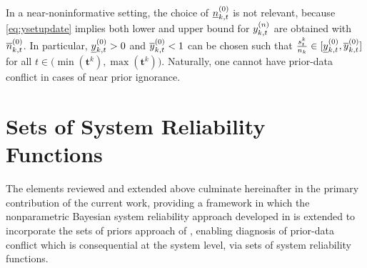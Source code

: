 \documentclass[12pt, a4paper]{elsarticle}
\newcommand{\bs}[1]{\boldsymbol{#1}}
\renewcommand{\vec}[1]{{\bs#1}}
\newcommand{\td}[1]{%
  \iftoggle{td}{%
    \todo[inline]{#1}%
  }{}%
}
\begin{document}
%
In a near-noninformative setting, the choice of $\underline{n}^{(0)}_{k,t}$ is not relevant,
because \eqref{eq:ysetupdate} implies both lower and upper bound for $y^{(n)}_{k,t}$ are obtained with $\overline{n}^{(0)}_{k,t}$.
In particular, $\underline{y}^{(0)}_{k,t} > 0$ and $\overline{y}^{(0)}_{k,t} < 1$ can be chosen such that
$\frac{s^k_t}{n_k} \in [\underline{y}^{(0)}_{k,t}, \overline{y}^{(0)}_{k,t}]$ for all $t \in \big(\min(\vec{t}^k), \max(\vec{t}^k)\big)$.
Naturally, one cannot have prior-data conflict in cases of near prior ignorance.


\section{Sets of System Reliability Functions}
\label{sec:setsofrel}

The elements reviewed and extended above culminate hereinafter in the primary contribution of the current work,
providing a framework in which the nonparametric Bayesian system reliability approach developed in \cite{2015:bayessurvsign}
is extended to incorporate the sets of priors approach of \citet{2009:WalterAugustin},
enabling diagnosis of prior-data conflict which is consequential at the system
level, via sets of system reliability functions.
\end{document}
